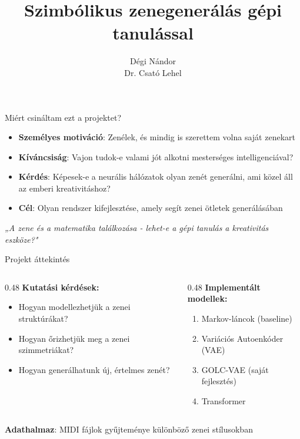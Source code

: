 \documentclass[aspectratio=169]{beamer}
\author{Dégi Nándor \\ Dr. Csató Lehel}
\title{Szimbólikus zenegenerálás gépi tanulással}
\begin{document}


\begin{frame}{Miért csináltam ezt a projektet?}
\begin{itemize}
    \item \textbf{Személyes motiváció}: Zenélek, és mindig is szerettem volna saját zenekart
    \item \textbf{Kíváncsiság}: Vajon tudok-e valami jót alkotni mesterséges intelligenciával?
    \item \textbf{Kérdés}: Képesek-e a neurális hálózatok olyan zenét generálni, ami közel áll az emberi kreativitáshoz?
    \item \textbf{Cél}: Olyan rendszer kifejlesztése, amely segít zenei ötletek generálásában
\end{itemize}

\vspace{1em}
\begin{center}
\textit{„A zene és a matematika találkozása - lehet-e a gépi tanulás a kreativitás eszköze?"}
\end{center}
\end{frame}

\begin{frame}{Projekt áttekintés}
\begin{columns}[T]
\begin{column}{0.48\textwidth}
\textbf{Kutatási kérdések:}
\begin{itemize}
    \item Hogyan modellezhetjük a zenei struktúrákat?
    \item Hogyan őrizhetjük meg a zenei szimmetriákat?
    \item Hogyan generálhatunk új, értelmes zenét?
\end{itemize}
\end{column}

\begin{column}{0.48\textwidth}
\textbf{Implementált modellek:}
\begin{enumerate}
    \item Markov-láncok (baseline)
    \item Variációs Autoenkóder (VAE)
    \item \alert{GOLC-VAE (saját fejlesztés)}
    \item Transformer
\end{enumerate}
\end{column}
\end{columns}

\vspace{1em}
\begin{center}
\textbf{Adathalmaz}: MIDI fájlok gyűjteménye különböző zenei stílusokban
\end{center}
\end{frame}
\end{document}

